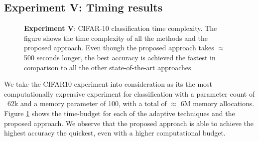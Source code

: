 


\subsection{Experiment V: Timing results}
\label{sec:Timing results}

\begin{figure}[!htb]
    \caption{\textbf{Experiment V}: CIFAR-10 classification time complexity. The figure shows the time complexity of all the methods and the proposed approach. Even though the proposed approach takes $\approx$ 500 seconds longer, the best accuracy is achieved the fastest in comparison to all the other state-of-the-art approaches.}\label{appnd:CIFAR10-timings}
\end{figure}
We take the CIFAR10 experiment into consideration as its the most computationally expensive experiment for classification with a parameter count of ~62k and a memory parameter of 100, with a total of $\approx$ 6M memory allocations. Figure \ref{appnd:CIFAR10-timings} shows the time-budget for each of the adaptive techniques and the proposed approach. We observe that the proposed approach is able to achieve the highest accuracy the quickest, even with a higher computational budget.
